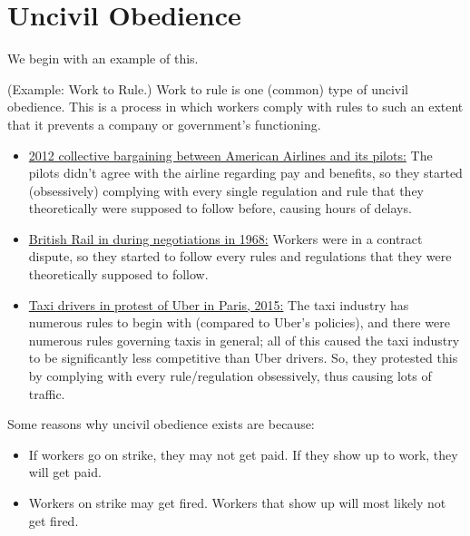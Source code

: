 \documentclass[letterpaper]{article}
\begin{document}
\section{Uncivil Obedience}
We begin with an example of this. 
\begin{mdframed}[]
    (Example: Work to Rule.) Work to rule is one (common) type of uncivil obedience. This is a process in which workers comply with rules to such an extent that it prevents a company or government's functioning.
    \begin{itemize}
        \item \underline{2012 collective bargaining between American Airlines and its pilots:} The pilots didn't agree with the airline regarding pay and benefits, so they started (obsessively) complying with every single regulation and rule that they theoretically were supposed to follow before, causing hours of delays.
        \item \underline{British Rail in during negotiations in 1968:} Workers were in a contract dispute, so they started to follow every rules and regulations that they were theoretically supposed to follow. 
        \item \underline{Taxi drivers in protest of Uber in Paris, 2015:} The taxi industry has numerous rules to begin with (compared to Uber's policies), and there were numerous rules governing taxis in general; all of this caused the taxi industry to be significantly less competitive than Uber drivers. So, they protested this by complying with every rule/regulation obsessively, thus causing lots of traffic. 
    \end{itemize} 
\end{mdframed}
Some reasons why uncivil obedience exists are because: 
\begin{itemize}
    \item If workers go on strike, they may not get paid. If they show up to work, they will get paid. 
    \item Workers on strike may get fired. Workers that show up will most likely not get fired. 
\end{itemize}
\end{document}

